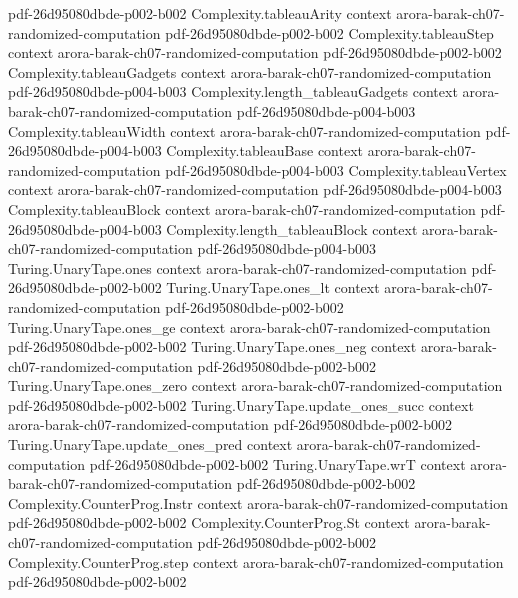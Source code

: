 \begin{theorem}
  {pdf-26d95080dbde-p002-b002}
\proofstep
  {Complexity.tableauArity}
  {context}
  {arora-barak-ch07-randomized-computation}
  {pdf-26d95080dbde-p002-b002}
\proofstep
  {Complexity.tableauStep}
  {context}
  {arora-barak-ch07-randomized-computation}
  {pdf-26d95080dbde-p002-b002}
\proofstep
  {Complexity.tableauGadgets}
  {context}
  {arora-barak-ch07-randomized-computation}
  {pdf-26d95080dbde-p004-b003}
\proofstep
  {Complexity.length_tableauGadgets}
  {context}
  {arora-barak-ch07-randomized-computation}
  {pdf-26d95080dbde-p004-b003}
\proofstep
  {Complexity.tableauWidth}
  {context}
  {arora-barak-ch07-randomized-computation}
  {pdf-26d95080dbde-p004-b003}
\proofstep
  {Complexity.tableauBase}
  {context}
  {arora-barak-ch07-randomized-computation}
  {pdf-26d95080dbde-p004-b003}
\proofstep
  {Complexity.tableauVertex}
  {context}
  {arora-barak-ch07-randomized-computation}
  {pdf-26d95080dbde-p004-b003}
\proofstep
  {Complexity.tableauBlock}
  {context}
  {arora-barak-ch07-randomized-computation}
  {pdf-26d95080dbde-p004-b003}
\proofstep
  {Complexity.length_tableauBlock}
  {context}
  {arora-barak-ch07-randomized-computation}
  {pdf-26d95080dbde-p004-b003}
\proofstep
  {Turing.UnaryTape.ones}
  {context}
  {arora-barak-ch07-randomized-computation}
  {pdf-26d95080dbde-p002-b002}
\proofstep
  {Turing.UnaryTape.ones_lt}
  {context}
  {arora-barak-ch07-randomized-computation}
  {pdf-26d95080dbde-p002-b002}
\proofstep
  {Turing.UnaryTape.ones_ge}
  {context}
  {arora-barak-ch07-randomized-computation}
  {pdf-26d95080dbde-p002-b002}
\proofstep
  {Turing.UnaryTape.ones_neg}
  {context}
  {arora-barak-ch07-randomized-computation}
  {pdf-26d95080dbde-p002-b002}
\proofstep
  {Turing.UnaryTape.ones_zero}
  {context}
  {arora-barak-ch07-randomized-computation}
  {pdf-26d95080dbde-p002-b002}
\proofstep
  {Turing.UnaryTape.update_ones_succ}
  {context}
  {arora-barak-ch07-randomized-computation}
  {pdf-26d95080dbde-p002-b002}
\proofstep
  {Turing.UnaryTape.update_ones_pred}
  {context}
  {arora-barak-ch07-randomized-computation}
  {pdf-26d95080dbde-p002-b002}
\proofstep
  {Turing.UnaryTape.wrT}
  {context}
  {arora-barak-ch07-randomized-computation}
  {pdf-26d95080dbde-p002-b002}
\proofstep
  {Complexity.CounterProg.Instr}
  {context}
  {arora-barak-ch07-randomized-computation}
  {pdf-26d95080dbde-p002-b002}
\proofstep
  {Complexity.CounterProg.St}
  {context}
  {arora-barak-ch07-randomized-computation}
  {pdf-26d95080dbde-p002-b002}
\proofstep
  {Complexity.CounterProg.step}
  {context}
  {arora-barak-ch07-randomized-computation}
  {pdf-26d95080dbde-p002-b002}

\end{theorem}
